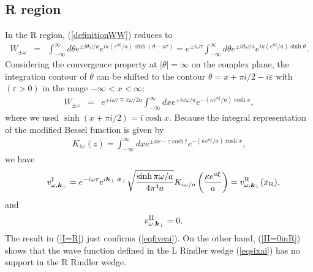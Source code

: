\documentclass[aps,prd,preprintnumbers,nofootinbib,showpacs,11pt]{revtex4}%
\begin{document}
\begin{widetext}
\subsection{R region}
In the R region, (\ref{definitionWW}) reduces to 
\begin{eqnarray}
W_{\pm \omega}&=&\int_{-\infty}^{\infty} {d\theta }e^{\pm i\theta\omega/a} e^{i\kappa (e^{a\xi}/a)\sinh (\theta-a\tau) }
=e^{\pm i\omega\tau}\int_{-\infty}^{\infty} {d\theta }e^{\pm i\theta\omega/a} e^{i\kappa (e^{a\xi}/a)\sinh \theta}.
\label{definitionWR}
\end{eqnarray}
Considering the convergence property at $|\theta|=\infty$ on the complex plane, 
the integration contour of $\theta$ can be shifted to
the contour $\theta= x +\pi i/2-i\varepsilon $ with $(\varepsilon>0)$ 
in the range $-\infty < x < \infty$:
\begin{eqnarray}
W_{\pm \omega}&=&e^{\pm i\omega\tau\mp \pi\omega/2a}\int_{-\infty}^{\infty} {dx }e^{\pm ix\omega/a} 
e^{-(\kappa e^{a\xi}/a)\cosh x} ,
\label{definitionWR2}
\end{eqnarray}
where we used $\sinh(x+\pi i/2)=i\cosh x$. 
Because the integral representation of the modified Bessel function is given by
\begin{eqnarray}
K_{i\omega}(z)=\int_{-\infty}^{\infty} {dx }e^{\pm x\nu-z\cosh t}  
e^{-(\kappa e^{a\xi}/a)\cosh x},
\label{definitionK}
\end{eqnarray}
we have 
\begin{eqnarray}
&&v^{\I}_{\omega,\bm k_\perp}=e^{-i\omega\tau} e^{i\bm k_\perp\cdot \bm x_\perp}\sqrt{\sinh \pi\omega/a \over 4\pi^4 a}
K_{i\omega/a}\left({\kappa e^{a\xi} \over a}\right)=v^{\R}_{\omega,\bm k_\perp}(x_{\rm R}),
\label{I=R}
\end{eqnarray}
and
\begin{eqnarray}
&&v^{\II}_{\omega,\bm k_\perp}=0 .
\label{II=0inR}
\end{eqnarray}
The result in (\ref{I=R}) just confirms (\ref{eqfiveai}).
On the other hand, (\ref{II=0inR}) shows that the wave function defined in the L 
Rindler wedge (\ref{eqsixai}) has no support in the R Rindler wedge.


\end{widetext}
\end{document}
